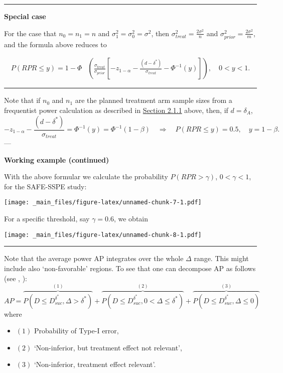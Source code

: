 \documentclass[
]{book}
\providecommand{\tightlist}{%
  \setlength{\itemsep}{0pt}\setlength{\parskip}{0pt}}
\begin{document}
\begin{center}\rule{0.5\linewidth}{0.5pt}\end{center}

\textbf{Special case}

For the case that \(n_0=n_1=n\) and \(\sigma_1^2=\sigma_0^2=\sigma^2\), then \(\sigma_{treat}^2=\frac{2\sigma^2}{n}\) and \(\sigma_{prior}^2=\frac{2\sigma^2}{m}\), and the formula above reduces to

\[
\begin{aligned}
P(RPR\leq y)=1-\Phi&\left(\frac{\sigma_{treat}}{\sigma_{prior}}\left[-z_{1-\alpha}-\frac{(d-\delta^*)}{\sigma_{treat}}-\Phi^{-1}(y) \right] \right), \quad 0<y<1.
\end{aligned}
\]

\begin{center}\rule{0.5\linewidth}{0.5pt}\end{center}

Note that if \(n_0\) and \(n_1\) are the planned treatment arm sample sizes from a frequentist power calculation as described in \protect\hyperlink{ux5cux23ux5cux23-frequentist-approach}{Section 2.1.1} above, then, if \(d=\delta_A\),
\[
-z_{1-\alpha}-\frac{(d-\delta^*)}{\sigma_{treat}}=\Phi^{-1}(y)=\Phi^{-1}(1-\beta) \quad \Rightarrow \quad P(RPR\leq y)=0.5, \quad y=1-\beta.
\]
---

\textbf{Working example (continued) }

With the above formular we calculate the probability \(P(RPR>\gamma)\), \(0<\gamma<1\), for the SAFE-SSPE study:

\texttt{[image: \_main\_files/figure-latex/unnamed-chunk-7-1.pdf]}

For a specific threshold, say \(\gamma=0.6\), we obtain

\texttt{[image: \_main\_files/figure-latex/unnamed-chunk-8-1.pdf]}

\begin{center}\rule{0.5\linewidth}{0.5pt}\end{center}

Note that the average power AP integrates over the whole \(\Delta\) range. This might include also `non-favorable' regions. To see that one can decompose AP as follows (see \citet{Kunzmann2022}, \citet{Grieve2022}):
\[
AP=\overbrace{P(D\leq D_{suc}^{\delta^*}, \Delta>\delta^*)}^{(1)}+\overbrace{P(D\leq D_{suc}^{\delta^*}, 0<\Delta\leq\delta^*)}^{(2)}+\overbrace{P(D\leq D_{suc}^{\delta^*}, \Delta\leq0)}^{(3)}
\]
where

\begin{itemize}
\tightlist
\item
  \((1)\) Probability of Type-I error,
\item
  \((2)\) `Non-inferior, but treatment effect not relevant',
\item
  \((3)\) `Non-inferior, treatment effect relevant'.
\end{itemize}
\end{document}
